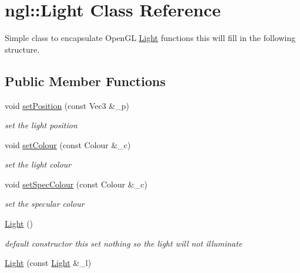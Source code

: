 \hypertarget{classngl_1_1_light}{\section{ngl\-:\-:Light Class Reference}
\label{classngl_1_1_light}
}


Simple class to encapsulate Open\-G\-L \hyperlink{classngl_1_1_light}{Light} functions this will fill in the following structure.  


\subsection*{Public Member Functions}
\begin{DoxyCompactItemize}
\item 
void \hyperlink{classngl_1_1_light_a627f74ab19975d3c63efc1c1750c65f9}{set\-Position} (const Vec3 \&\-\_\-p)
\begin{DoxyCompactList}\small\item\em set the light position \end{DoxyCompactList}\item 
void \hyperlink{classngl_1_1_light_a523bccc4d967748e2ec6bc9c010b3ea6}{set\-Colour} (const Colour \&\-\_\-c)
\begin{DoxyCompactList}\small\item\em set the light colour \end{DoxyCompactList}\item 
void \hyperlink{classngl_1_1_light_a3921ca844ad910bd45e548c696f29aed}{set\-Spec\-Colour} (const Colour \&\-\_\-c)
\begin{DoxyCompactList}\small\item\em set the specular colour \end{DoxyCompactList}\item 
\hypertarget{classngl_1_1_light_a4ef64392703e2ee243ce03ae8a745e9d}{\hyperlink{classngl_1_1_light_a4ef64392703e2ee243ce03ae8a745e9d}{Light} ()}\label{classngl_1_1_light_a4ef64392703e2ee243ce03ae8a745e9d}

\begin{DoxyCompactList}\small\item\em default constructor this set nothing so the light will not illuminate \end{DoxyCompactList}\item 
\hypertarget{classngl_1_1_light_a775bed44aff46ab92a463e7b0d409564}{\hyperlink{classngl_1_1_light_a775bed44aff46ab92a463e7b0d409564}{Light} (const \hyperlink{classngl_1_1_light}{Light} \&\-\_\-l)}\label{classngl_1_1_light_a775bed44aff46ab92a463e7b0d409564}


\end{DoxyCompactItemize}
